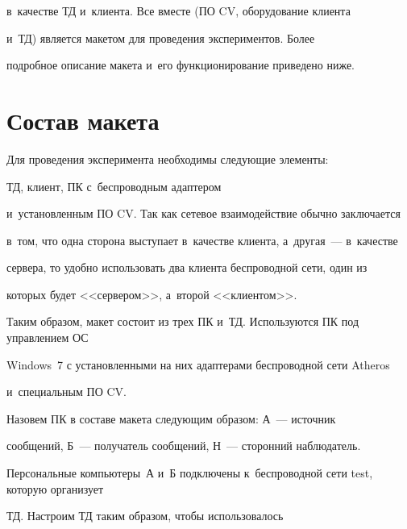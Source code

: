 в~качестве ТД и~клиента. Все вместе (ПО CV, оборудование клиента


и~ТД) является макетом для проведения экспериментов. Более


подробное описание макета и~его функционирование приведено ниже.





\vspace*{-4pt}





\section{Состав макета}





\vspace*{-2pt}





  Для проведения эксперимента необходимы следующие элементы:


ТД, клиент, ПК с~беспроводным адаптером


и~уста\-нов\-лен\-ным ПО CV. Так как сетевое взаимодействие обычно заключается


в~том, что одна сторона выступает в~качестве клиента, а~другая~--- в~качестве


сервера, то удобно использовать два клиента беспроводной сети, один из


которых будет <<сервером>>, а~второй <<клиентом>>.





  Таким образом, макет состоит из трех ПК и~ТД. Используются ПК под управлением ОС


Windows~7 с установленными на них адаптерами беспроводной сети Atheros


и~специальным ПО CV.





  Назовем ПК в составе макета следующим образом: А~--- источник


сообщений, Б~--- получатель сообщений, Н~--- сторонний наблюдатель.


Персональные компьютеры~А и~Б подключены к~беспроводной сети test, которую организует


ТД. Настроим ТД таким образом, чтобы использовалось


